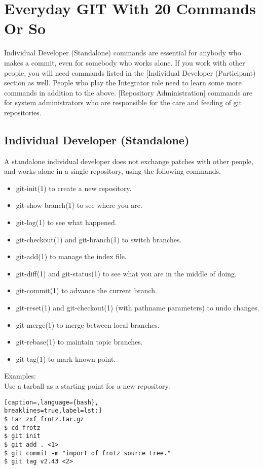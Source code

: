 \section{Everyday GIT With 20 Commands Or So}
Individual Developer (Standalone) commands are essential for anybody who makes
a commit, even for somebody who works alone.  If you work with other people,
you will need commands listed in the [Individual Developer (Participant)
section as well.  People who play the Integrator role need to learn some more
commands in addition to the above.  [Repository Administration] commands are
for system administrators who are responsible for the care and feeding of git
repositories.

\subsection{Individual Developer (Standalone)}
A standalone individual developer does not exchange patches with other people,
and works alone in a single repository, using the following commands.

\begin{itemize}
\setlength{\itemsep}{0cm}
\setlength{\parskip}{0cm}
\item git-init(1) to create a new repository.
\item git-show-branch(1) to see where you are.
\item git-log(1) to see what happened.
\item git-checkout(1) and git-branch(1) to switch branches.
\item git-add(1) to manage the index file.
\item git-diff(1) and git-status(1) to see what you are in the middle of doing.
\item git-commit(1) to advance the current branch.
\item git-reset(1) and git-checkout(1) (with pathname parameters) to undo changes.
\item git-merge(1) to merge between local branches.
\item git-rebase(1) to maintain topic branches.
\item git-tag(1) to mark known point.
\end{itemize}

Examples:\\
Use a tarball as a starting point for a new repository.
\lstset{basicstyle=\scriptsize, numbers=none, captionpos=b, tabsize=4}
\begin{lstlisting}[caption=,language={bash},
breaklines=true,label=lst:]
$ tar zxf frotz.tar.gz
$ cd frotz
$ git init
$ git add . <1>
$ git commit -m "import of frotz source tree."
$ git tag v2.43 <2>
\end{lstlisting}

